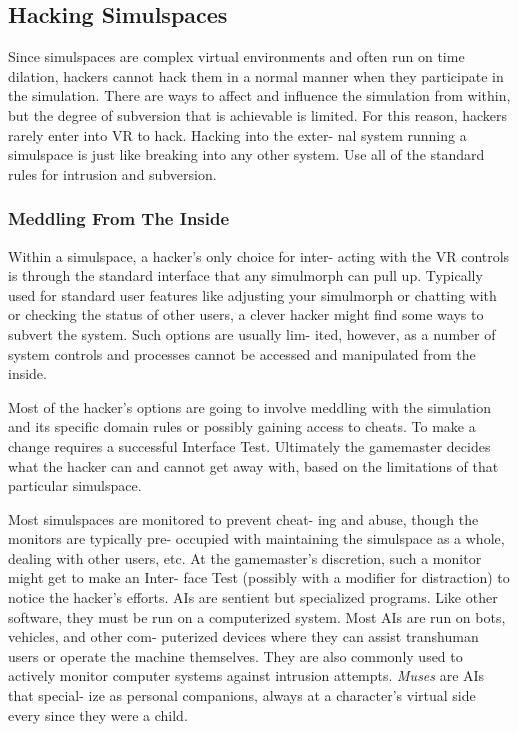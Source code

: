 \subsection{Hacking Simulspaces}

Since simulspaces are complex virtual environments 
and often run on time dilation, hackers cannot hack 
them in a normal manner when they participate in the 
simulation. There are ways to affect and influence the 
simulation from within, but the degree of subversion 
that is achievable is limited. For this reason, hackers 
rarely enter into VR to hack. Hacking into the exter-
nal system running a simulspace is just like breaking 
into any other system. Use all of the standard rules for 
intrusion and subversion.

\subsubsection{Meddling From The Inside}

Within a simulspace, a hacker's only choice for inter-
acting with the VR controls is through the standard 
interface that any simulmorph can pull up. Typically 
used for standard user features like adjusting your 
simulmorph or chatting with or checking the status 
of other users, a clever hacker might find some ways 
to subvert the system. Such options are usually lim-
ited, however, as a number of system controls and 
processes cannot be accessed and manipulated from 
the inside.

Most of the hacker's options are going to involve 
meddling with the simulation and its specific domain 
rules or possibly gaining access to cheats. To make a 
change requires a successful Interface Test. Ultimately 
the gamemaster decides what the hacker can and 
cannot get away with, based on the limitations of that 
particular simulspace.

Most simulspaces are monitored to prevent cheat-
ing and abuse, though the monitors are typically pre-
occupied with maintaining the simulspace as a whole, 
dealing with other users, etc. At the gamemaster's 
discretion, such a monitor might get to make an Inter-
face Test (possibly with a modifier for distraction) to 
notice the hacker's efforts.
AIs are sentient but specialized programs. Like other 
software, they must be run on a computerized system. 
Most AIs are run on bots, vehicles, and other com-
puterized devices where they can assist transhuman 
users or operate the machine themselves. They are also 
commonly used to actively monitor computer systems 
against intrusion attempts. \textit{Muses} are AIs that special-
ize as personal companions, always at a character's 
virtual side every since they were a child.

